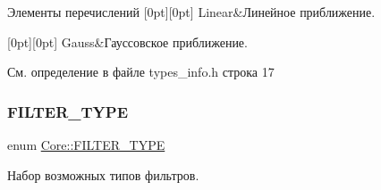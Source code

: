 \begin{DoxyEnumFields}{Элементы перечислений}
[0pt][0pt]{}\hypertarget{namespace_core_acd67f53ff1d9b21fabb1da4474a8f7d9a32a843da6ea40ab3b17a3421ccdf671b}{}\label{namespace_core_acd67f53ff1d9b21fabb1da4474a8f7d9a32a843da6ea40ab3b17a3421ccdf671b} 
Linear&Линейное приближение. \\
\hline

[0pt][0pt]{}\hypertarget{namespace_core_acd67f53ff1d9b21fabb1da4474a8f7d9aedc41fb7bf8bdac012523d1bcd949a4f}{}\label{namespace_core_acd67f53ff1d9b21fabb1da4474a8f7d9aedc41fb7bf8bdac012523d1bcd949a4f} 
Gauss&Гауссовское приближение. \\
\hline

\end{DoxyEnumFields}


См. определение в файле types\+\_\+info.\+h строка 17

\hypertarget{namespace_core_af88278693f3c866f217da796f4bb9af7}{}\label{namespace_core_af88278693f3c866f217da796f4bb9af7} 
\subsubsection{\texorpdfstring{F\+I\+L\+T\+E\+R\+\_\+\+T\+Y\+PE}{FILTER\_TYPE}}
{\footnotesize\ttfamily enum \hyperlink{namespace_core_af88278693f3c866f217da796f4bb9af7}{Core\+::\+F\+I\+L\+T\+E\+R\+\_\+\+T\+Y\+PE}\hspace{0.3cm}{\ttfamily [strong]}}



Набор возможных типов фильтров. 

